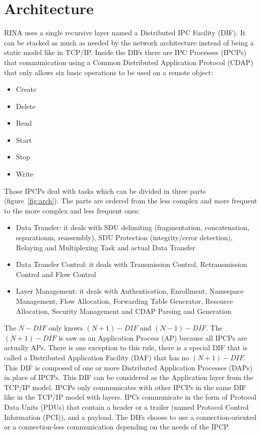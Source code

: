 \documentclass[a4paper]{proc}
\begin{document}
\section{Architecture}
RINA uses a single recursive layer named a Distributed IPC Facility (DIF). It can be stacked as much as needed by the network architecture instead of being a static model like in TCP/IP\@.
Inside the DIFs there are IPC Processes (IPCPs) that communication using a Common Distributed Application Protocol (CDAP) that only allows six basic operations to be used on a remote object\cite{wiki}:
\begin{itemize}
    \item Create
    \item Delete
    \item Read
    \item Start
    \item Stop
    \item Write
\end{itemize}
Those IPCPs deal with tasks which can be divided in three parts (figure~\ref{fig:arch}).
The parts are ordered from the less complex and more frequent to the more complex and less frequent ones:
\begin{itemize}
    \item Data Transfer: it deals with SDU delimiting (fragmentation, concatenation, separationm, reassembly), SDU Protection (integrity/error detection), Relaying and Multiplexing Task and actual Data Transfer\cite{irati}
    \item Data Transfer Control: it deals with Transmission Control, Retransmission Control and Flow Control
    \item Layer Management: it deals with Authentication, Enrollment, Namespace Management, Flow Allocation, Forwarding Table Generator, Resource Allocation, Security Management and CDAP Parsing and Generation
\end{itemize}
The $N-DIF$ only knows $(N + 1)-DIF$ and $(N - 1)-DIF$\@.
The $(N + 1)-DIF$ is saw as an Application Process (AP) because all IPCPs are actually APs.
There is one exception to this rule, there is a special DIF that is called a Distributed Application Facility (DAF) that has no $(N + 1)-DIF$\@.
This DIF is composed of one or more Distributed Application Processes (DAPs) in place of IPCPs.
This DIF can be considered as the Application layer from the TCP/IP model.
IPCPs only communicates with other IPCPs in the same DIF like in the TCP/IP model with layers.
IPCs communicate in the form of Protocol Data Units (PDUs) that contain a header or a trailer (named Protocol Control Information (PCI)), and a payload.\cite{PINS}
The DIFs choose to use a connection-oriented or a connection-less communication depending on the needs of the IPCP\@.
\end{document}
